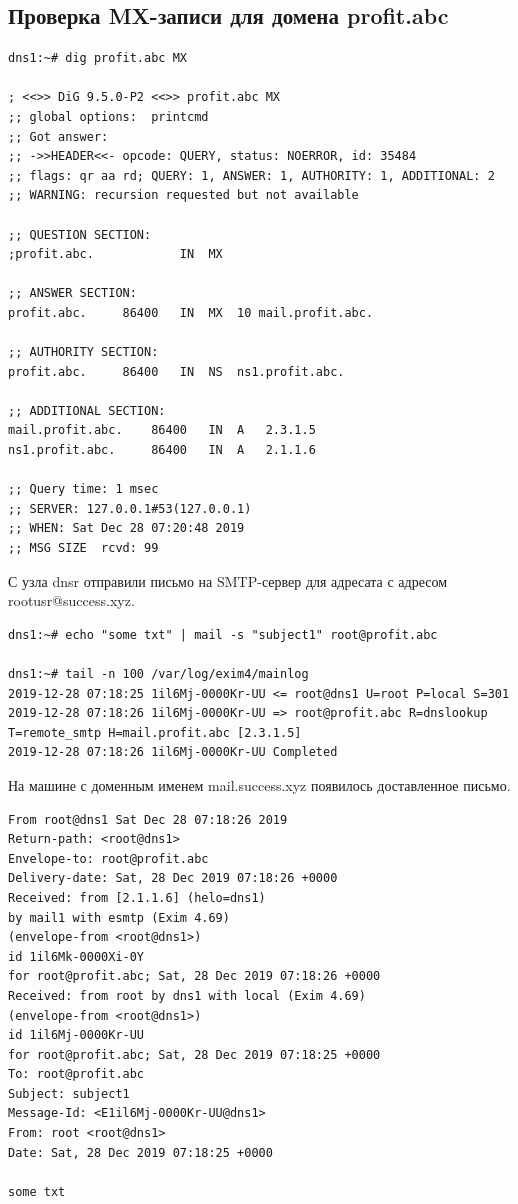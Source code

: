 \documentclass[a4paper,12pt]{article}
\begin{document}
\subsection{Проверка MX-записи для домена profit.abc}

\begin{verbatim}
dns1:~# dig profit.abc MX

; <<>> DiG 9.5.0-P2 <<>> profit.abc MX
;; global options:  printcmd
;; Got answer:
;; ->>HEADER<<- opcode: QUERY, status: NOERROR, id: 35484
;; flags: qr aa rd; QUERY: 1, ANSWER: 1, AUTHORITY: 1, ADDITIONAL: 2
;; WARNING: recursion requested but not available

;; QUESTION SECTION:
;profit.abc.			IN	MX

;; ANSWER SECTION:
profit.abc.		86400	IN	MX	10 mail.profit.abc.

;; AUTHORITY SECTION:
profit.abc.		86400	IN	NS	ns1.profit.abc.

;; ADDITIONAL SECTION:
mail.profit.abc.	86400	IN	A	2.3.1.5
ns1.profit.abc.		86400	IN	A	2.1.1.6

;; Query time: 1 msec
;; SERVER: 127.0.0.1#53(127.0.0.1)
;; WHEN: Sat Dec 28 07:20:48 2019
;; MSG SIZE  rcvd: 99
\end{verbatim}

С узла dnsr отправили письмо на SMTP-сервер для адресата с адресом rootusr@success.xyz.

\begin{verbatim}
dns1:~# echo "some txt" | mail -s "subject1" root@profit.abc

dns1:~# tail -n 100 /var/log/exim4/mainlog
2019-12-28 07:18:25 1il6Mj-0000Kr-UU <= root@dns1 U=root P=local S=301
2019-12-28 07:18:26 1il6Mj-0000Kr-UU => root@profit.abc R=dnslookup T=remote_smtp H=mail.profit.abc [2.3.1.5]
2019-12-28 07:18:26 1il6Mj-0000Kr-UU Completed
\end{verbatim}

На машине с доменным именем mail.success.xyz появилось доставленное письмо.
\begin{verbatim}
From root@dns1 Sat Dec 28 07:18:26 2019
Return-path: <root@dns1>
Envelope-to: root@profit.abc
Delivery-date: Sat, 28 Dec 2019 07:18:26 +0000
Received: from [2.1.1.6] (helo=dns1)
by mail1 with esmtp (Exim 4.69)
(envelope-from <root@dns1>)
id 1il6Mk-0000Xi-0Y
for root@profit.abc; Sat, 28 Dec 2019 07:18:26 +0000
Received: from root by dns1 with local (Exim 4.69)
(envelope-from <root@dns1>)
id 1il6Mj-0000Kr-UU
for root@profit.abc; Sat, 28 Dec 2019 07:18:25 +0000
To: root@profit.abc
Subject: subject1
Message-Id: <E1il6Mj-0000Kr-UU@dns1>
From: root <root@dns1>
Date: Sat, 28 Dec 2019 07:18:25 +0000

some txt
\end{verbatim}
\end{document}
